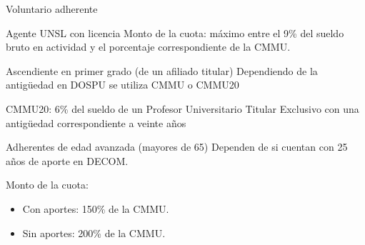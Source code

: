 \documentclass[10pt]{beamer}
\begin{document}
\begin{frame}{Voluntario adherente}
    \begin{block}{Agente UNSL con licencia}
        Monto de la cuota: máximo entre el 9\% del sueldo bruto en actividad y el porcentaje correspondiente de la CMMU.
    \end{block}
    \begin{block}{Ascendiente en primer grado (de un afiliado titular)}
        Dependiendo de la antigüedad en DOSPU se utiliza CMMU o CMMU20

        CMMU20: 6\% del sueldo de un Profesor Universitario Titular Exclusivo con una antigüedad correspondiente a veinte años
    \end{block}
    \begin{block}{Adherentes de edad avanzada (mayores de 65)}
        Dependen de si cuentan con 25 años de aporte en DECOM.

        Monto de la cuota:
        \begin{itemize}
            \item Con aportes: 150\% de la CMMU.
            \item Sin aportes: 200\% de la CMMU.
        \end{itemize}
    \end{block}
\end{frame}

\end{document}
